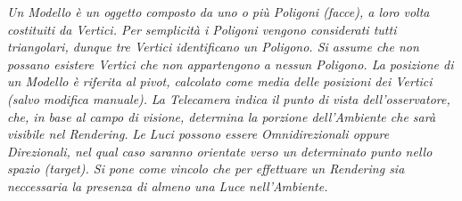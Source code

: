 \documentclass[a4paper,12pt]{report}
\begin{document}
{\it Un Modello è un oggetto composto da uno o più Poligoni (facce), a loro volta costituiti da Vertici. Per semplicità i Poligoni vengono considerati tutti triangolari, dunque tre Vertici identificano un Poligono. Si assume che non possano esistere Vertici che non appartengono a nessun Poligono. La posizione di un Modello è riferita al pivot, calcolato come media delle posizioni dei Vertici (salvo modifica manuale).}
{\it La Telecamera indica il punto di vista dell'osservatore, che, in base al campo di visione, determina la porzione dell'Ambiente che sarà visibile nel Rendering.}
{\it Le Luci possono essere Omnidirezionali oppure Direzionali, nel qual caso saranno orientate verso un determinato punto nello spazio (target). Si pone come vincolo che per effettuare un Rendering sia neccessaria la presenza di almeno una Luce nell'Ambiente.}
\end{document}
